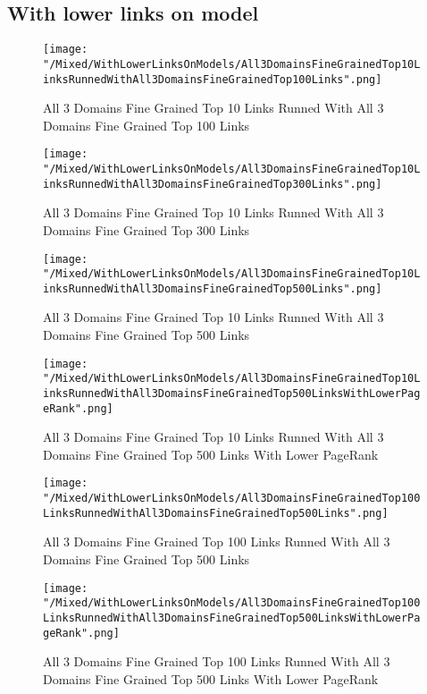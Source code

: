 \documentclass[thesis=M,english]{FITthesis}[2012/10/20]
\begin{document}
\subsection{With lower links on model}	
	\begin{figure}\centering
		\texttt{[image: "/Mixed/WithLowerLinksOnModels/All3DomainsFineGrainedTop10LinksRunnedWithAll3DomainsFineGrainedTop100Links".png]}
		\caption{All 3 Domains Fine Grained Top 10 Links Runned With All 3 Domains Fine Grained Top 100 Links}\label{}
	\end{figure}
	
	\begin{figure}\centering
		\texttt{[image: "/Mixed/WithLowerLinksOnModels/All3DomainsFineGrainedTop10LinksRunnedWithAll3DomainsFineGrainedTop300Links".png]}
		\caption{All 3 Domains Fine Grained Top 10 Links Runned With All 3 Domains Fine Grained Top 300 Links}\label{}
	\end{figure}
	
	\begin{figure}\centering
		\texttt{[image: "/Mixed/WithLowerLinksOnModels/All3DomainsFineGrainedTop10LinksRunnedWithAll3DomainsFineGrainedTop500Links".png]}
		\caption{All 3 Domains Fine Grained Top 10 Links Runned With All 3 Domains Fine Grained Top 500 Links}\label{}
	\end{figure}
	
	\begin{figure}\centering
		\texttt{[image: "/Mixed/WithLowerLinksOnModels/All3DomainsFineGrainedTop10LinksRunnedWithAll3DomainsFineGrainedTop500LinksWithLowerPageRank".png]}
		\caption{All 3 Domains Fine Grained Top 10 Links Runned With All 3 Domains Fine Grained Top 500 Links With Lower PageRank}\label{}
	\end{figure}
	
	\begin{figure}\centering
		\texttt{[image: "/Mixed/WithLowerLinksOnModels/All3DomainsFineGrainedTop100LinksRunnedWithAll3DomainsFineGrainedTop500Links".png]}
		\caption{All 3 Domains Fine Grained Top 100 Links Runned With All 3 Domains Fine Grained Top 500 Links}\label{}
	\end{figure}
	
	\begin{figure}\centering
		\texttt{[image: "/Mixed/WithLowerLinksOnModels/All3DomainsFineGrainedTop100LinksRunnedWithAll3DomainsFineGrainedTop500LinksWithLowerPageRank".png]}
		\caption{All 3 Domains Fine Grained Top 100 Links Runned With All 3 Domains Fine Grained Top 500 Links With Lower PageRank}\label{}
	\end{figure}
	
\end{document}
